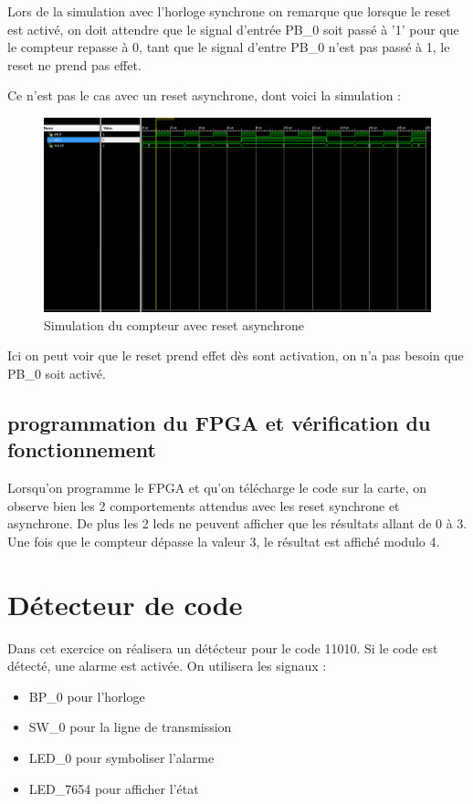 \documentclass[11pt]{report}
\begin{document}
Lors de la simulation avec l'horloge synchrone on remarque que lorsque le reset est activé, on doit attendre que le signal d'entrée PB\_0 soit passé à '1' pour que le compteur repasse à 0, tant que le signal d'entre PB\_0 n'est pas passé à 1, le reset ne prend pas effet.

Ce n'est pas le cas avec un reset asynchrone, dont voici la simulation :

\begin{figure}[h]
\includegraphics[width=15cm]{TP02-5.PNG}
\caption{Simulation du compteur avec reset asynchrone}
\end{figure}

Ici on peut voir que le reset prend effet dès sont activation, on n'a pas besoin que PB\_0 soit activé. 

  
   \subsection{programmation du FPGA et vérification du fonctionnement}
   
   Lorsqu'on programme le FPGA et qu'on télécharge le code sur la carte, on observe bien les 2 comportements attendus avec les reset synchrone et asynchrone. 
   De plus les 2 leds ne peuvent afficher que les résultats allant de 0 à 3. Une fois que le compteur dépasse la valeur 3, le résultat est affiché modulo 4. 
   
   
\newpage
\newpage
   
 

\section{Détecteur de code}

Dans cet exercice on réalisera un détécteur pour le code 11010. Si le code est détecté, une alarme est activée. On utilisera les signaux :
\begin{itemize}
	\item BP\_0 pour l'horloge
	\item SW\_0 pour la ligne de transmission
	\item LED\_0 pour symboliser l'alarme
	\item LED\_7654 pour afficher l'état

\end{itemize}
\end{document}
